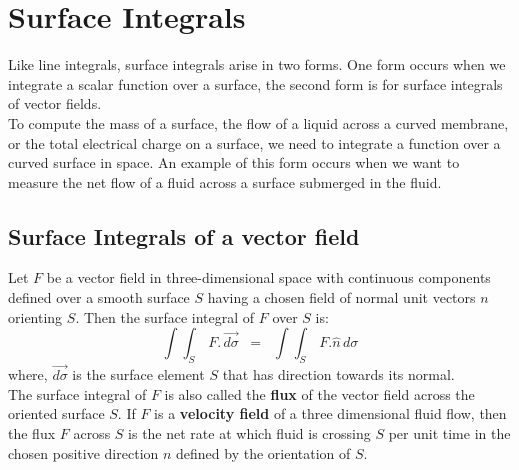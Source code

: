 \documentclass[aima331_lecturenotes_ku.tex]{subfiles}
\begin{document}
\section{Surface Integrals}
Like line integrals, surface integrals arise in two forms. One form occurs when we integrate a scalar function over a surface, the second form is for surface integrals of vector fields. \\
To compute the mass of a surface, the flow of a liquid across a curved membrane, or the total electrical charge on a surface, we need to integrate a function over a curved surface in space. An example of this form occurs when we want to measure the net flow of a fluid across a surface submerged in the fluid.

\subsection{Surface Integrals of a vector field}
Let $F$ be a vector field in three-dimensional space with continuous components defined over a smooth surface $S$ having a chosen field of normal unit vectors $n$ orienting $S$. Then the surface integral of $F$ over $S$ is:
\begin{equation}
  \label{surf}
  \int\int_S \, F. \, \vec{d\sigma} \;\;= \;\; \int\int_S \, F. \hat{n}\, d\sigma
\end{equation}
where, $\vec{d\sigma}$ is the surface element $S$ that has direction towards its normal. \\[2mm]
The surface integral of $F$ is also called the \textbf{flux} of the vector field across the oriented surface $S$. If $F$ is a \textbf{velocity field} of a three dimensional fluid flow, then the flux $F$ across $S$ is the net rate at which fluid is crossing $S$ per unit time in the chosen positive direction $n$ defined by the orientation of $S$.
\end{document}
